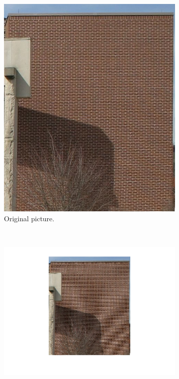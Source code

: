 \begin{figure}[h]
\centering
\begin{subfigure}{0.3\textwidth} 
\includegraphics[width= \textwidth]{../Images/bricks.jpg}
\vspace{-30pt}
\caption{Original picture.}
\label{fig:bricksOriginal}
\end{subfigure}
~
\begin{subfigure}{0.4\textwidth} 
\includegraphics[width= \textwidth]{../Images/bricksCompressed.png}

\end{subfigure}
\end{figure}
